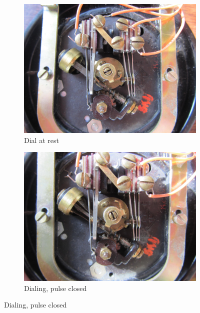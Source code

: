 \documentclass{es50report}
\begin{document}
    \begin{figure}
        \centering
        \begin{subfigure}[b]{0.47\textwidth}
                \includegraphics[width=\textwidth, clip=true, trim=300 250 300 70]{images/small/dialRest}
                \caption{Dial at rest}
                \label{fig:dialRest}
        \end{subfigure}
        \begin{subfigure}[b]{0.47\textwidth}
                \includegraphics[width=\textwidth, clip=true, trim=300 250 300 70]{images/small/dialIsDialing}
                \caption{Dialing, pulse closed}
                \label{fig:dialIsDialing}
        \end{subfigure}
        

\end{figure}
\end{document}
